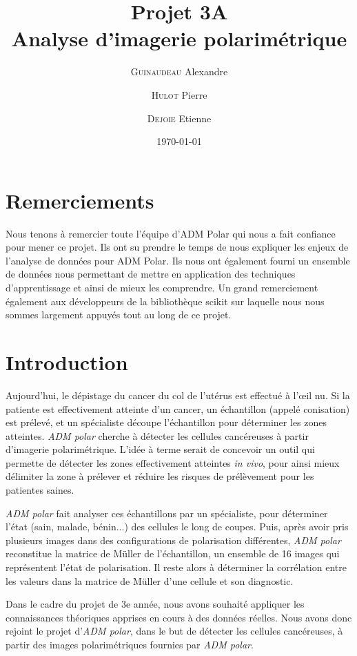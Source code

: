\documentclass[a4paper,10pt]{report}
\title{Projet 3A\\Analyse d'imagerie polarimétrique}
\author{\textsc{Guinaudeau} Alexandre\\
	\and 
	\textsc{Hulot} Pierre
	\and 
	\textsc{Dejoie} Etienne	
	}
\date{\today}
\begin{document}
\maketitle
\chapter*{Remerciements}
Nous tenons à remercier toute l'équipe d'ADM Polar qui nous a fait confiance pour mener ce projet. Ils ont su prendre le temps de nous expliquer les enjeux de l'analyse de données pour ADM Polar. Ils nous ont également fourni un ensemble de données nous permettant de mettre en application des techniques d'apprentissage et ainsi de mieux les comprendre.
Un grand remerciement également aux développeurs de la bibliothèque scikit sur laquelle nous nous sommes largement appuyés tout au long de ce projet.

\chapter*{Introduction}

Aujourd'hui, le dépistage du cancer du col de l'utérus est effectué à l'\oe il nu. Si la patiente est effectivement atteinte d'un cancer, un échantillon (appelé conisation) est prélevé, et un spécialiste découpe l'échantillon pour déterminer les zones atteintes. \emph{ADM polar} cherche à détecter les cellules cancéreuses à partir d'imagerie polarimétrique. 
L'idée à terme serait de concevoir un outil qui permette de détecter les zones effectivement atteintes \emph{in vivo}, pour ainsi mieux délimiter la zone à prélever et réduire les risques de prélèvement pour les patientes saines.

\emph{ADM polar} fait analyser ces échantillons par un spécialiste, pour déterminer l'état (sain, malade, bénin...) des cellules le long de coupes.
Puis, après avoir pris plusieurs images dans des configurations de polarisation différentes, \emph{ADM polar} reconstitue la matrice de Müller de l'échantillon, un ensemble de 16 images qui représentent l'état de polarisation.
Il reste alors à déterminer la corrélation entre les valeurs dans la matrice de Müller d'une cellule et son diagnostic.

Dans le cadre du projet de 3e année, nous avons souhaité appliquer les connaissances théoriques apprises en cours à des données réelles. Nous avons donc rejoint le projet d'\emph{ADM polar}, dans le but de détecter les cellules cancéreuses, à partir des images polarimétriques fournies par \emph{ADM polar}.
\end{document}
